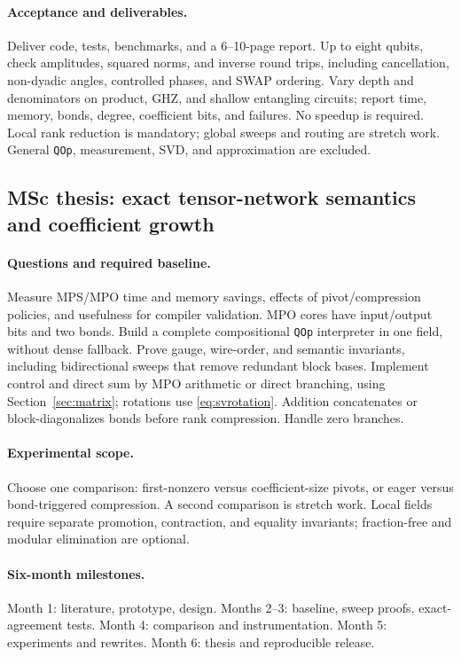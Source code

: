 \documentclass[11pt,a4paper]{article}
\newcommand{\code}[1]{\texttt{#1}}
\begin{document}
\paragraph{Acceptance and deliverables.}
Deliver code, tests, benchmarks, and a 6--10-page report. Up to eight qubits,
check amplitudes, squared norms, and inverse round trips, including cancellation,
non-dyadic angles, controlled phases, and SWAP ordering. Vary depth and
denominators on product, GHZ, and shallow entangling circuits; report time,
memory, bonds, degree, coefficient bits, and failures. No speedup is required.
Local rank reduction is mandatory; global sweeps and routing are stretch work.
General \code{QOp}, measurement, SVD, and approximation are excluded.

\subsection{MSc thesis: exact tensor-network semantics and coefficient growth}
\label{sec:msc}
\paragraph{Questions and required baseline.}
Measure MPS/MPO time and memory savings, effects of pivot/compression policies,
and usefulness for compiler validation. MPO cores have input/output bits and two bonds.
Build a complete compositional \code{QOp} interpreter in one field, without
dense fallback. Prove gauge, wire-order, and semantic invariants, including
bidirectional sweeps that remove redundant block bases. Implement control
and direct sum by MPO arithmetic or direct branching, using Section~\ref{sec:matrix};
rotations use \eqref{eq:svrotation}. Addition concatenates or block-diagonalizes
bonds before rank compression. Handle zero branches.

\paragraph{Experimental scope.}
Choose one comparison: first-nonzero versus coefficient-size pivots, or eager
versus bond-triggered compression. A second comparison is stretch work.
Local fields require separate promotion, contraction, and equality invariants;
fraction-free and modular elimination are optional.

\paragraph{Six-month milestones.}
Month 1: literature, prototype, design. Months 2--3: baseline, sweep proofs,
exact-agreement tests. Month 4: comparison and instrumentation. Month 5:
experiments and rewrites. Month 6: thesis and reproducible release.
\end{document}
